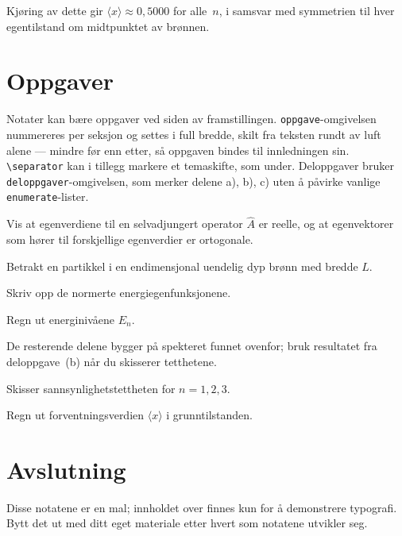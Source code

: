 \documentclass[a4paper,11pt]{article}
\begin{document}
Kjøring av dette gir $\langle x \rangle \approx 0{,}5000$ for alle~$n$, i samsvar med symmetrien til hver egentilstand om midtpunktet av brønnen.


\section{Oppgaver}

Notater kan bære oppgaver ved siden av framstillingen.
\verb|oppgave|-omgivelsen nummereres per seksjon og settes i
full bredde, skilt fra teksten rundt av luft alene — mindre før enn etter, så oppgaven bindes til innledningen sin.
\verb|\separator| kan i tillegg markere et temaskifte, som
under. Deloppgaver bruker \verb|deloppgaver|-omgivelsen, som merker delene a), b), c) uten å påvirke vanlige
\verb|enumerate|-lister.

\separator

\begin{oppgave}
  Vis at egenverdiene til en selvadjungert operator $\hat{A}$ er reelle, og at egenvektorer som hører til forskjellige egenverdier er ortogonale.
\end{oppgave}

\begin{oppgave}
  Betrakt en partikkel i en endimensjonal uendelig dyp brønn med bredde $L$.
  \begin{deloppgaver}
    \item Skriv opp de normerte energiegenfunksjonene.
    \item Regn ut energinivåene $E_n$.
  \end{deloppgaver}

  De resterende delene bygger på spekteret funnet ovenfor; bruk resultatet fra deloppgave~(b) når du skisserer tetthetene.

  \begin{deloppgaver}[resume]
    \item Skisser sannsynlighetstettheten for $n = 1, 2, 3$.
    \item Regn ut forventningsverdien $\langle x \rangle$ i grunntilstanden.
  \end{deloppgaver}
\end{oppgave}


\section{Avslutning}

Disse notatene er en mal; innholdet over finnes kun for å demonstrere typografi. Bytt det ut med ditt eget materiale etter hvert som notatene utvikler seg.


\printbibliography
\end{document}
